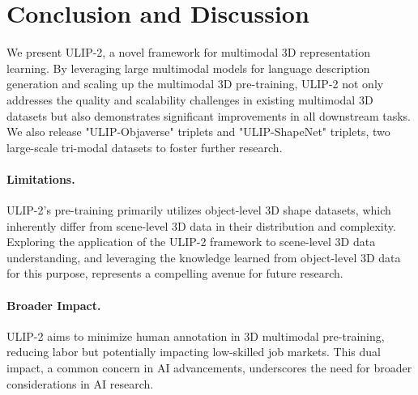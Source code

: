 \documentclass[10pt,twocolumn,letterpaper]{article}
\begin{document}

\vspace{-2mm}
\section{Conclusion and Discussion}
\vspace{-2mm}
We present ULIP-2, a novel framework for multimodal 3D representation learning. By leveraging large multimodal models for language description generation and scaling up the multimodal 3D pre-training, ULIP-2 not only addresses the quality and scalability challenges in existing multimodal 3D datasets but also demonstrates significant improvements in all downstream tasks. We also release "ULIP-Objaverse" triplets and "ULIP-ShapeNet" triplets, two large-scale tri-modal datasets to foster further research.

\vspace{-4mm}
\paragraph{Limitations.}
ULIP-2's pre-training primarily utilizes object-level 3D shape datasets, which inherently differ from scene-level 3D data in their distribution and complexity. Exploring the application of the ULIP-2 framework to scene-level 3D data understanding, and leveraging the knowledge learned from object-level 3D data for this purpose, represents a compelling avenue for future research.

\vspace{-4mm}
\paragraph{Broader Impact.}
ULIP-2 aims to minimize human annotation in 3D multimodal pre-training, reducing labor but potentially impacting low-skilled job markets. This dual impact, a common concern in AI advancements, underscores the need for broader considerations in AI research.
\end{document}
